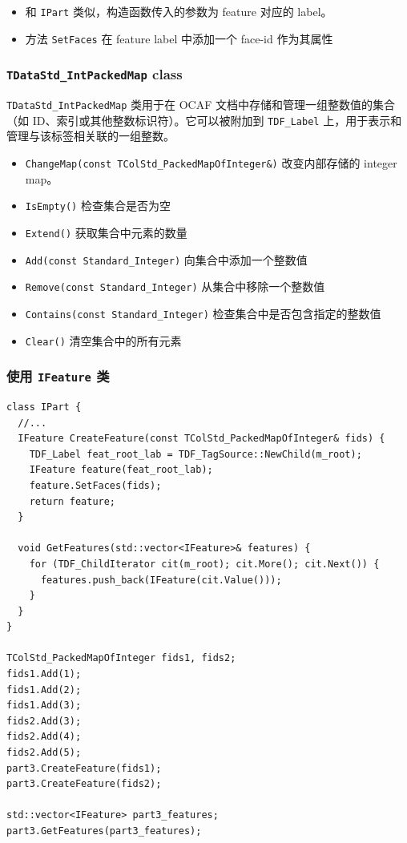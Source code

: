 \documentclass[11pt]{article}
\begin{document}
\begin{itemize}
\item 和 \texttt{IPart} 类似，构造函数传入的参数为 feature 对应的 label。
\item 方法 \texttt{SetFaces} 在 feature label 中添加一个 face-id 作为其属性
\end{itemize}
\subsubsection{\texttt{TDataStd\_IntPackedMap} class}
\label{sec:org2256694}

\texttt{TDataStd\_IntPackedMap} 类用于在 OCAF 文档中存储和管理一组整数值的集合（如 ID、索引或其他整数标识符）。它可以被附加到 \texttt{TDF\_Label} 上，用于表示和管理与该标签相关联的一组整数。

\begin{itemize}
\item \texttt{ChangeMap(const TColStd\_PackedMapOfInteger\&)} 改变内部存储的 integer map。
\item \texttt{IsEmpty()} 检查集合是否为空
\item \texttt{Extend()} 获取集合中元素的数量
\item \texttt{Add(const Standard\_Integer)} 向集合中添加一个整数值
\item \texttt{Remove(const Standard\_Integer)} 从集合中移除一个整数值
\item \texttt{Contains(const Standard\_Integer)} 检查集合中是否包含指定的整数值
\item \texttt{Clear()} 清空集合中的所有元素
\end{itemize}
\subsubsection{使用 \texttt{IFeature} 类}
\label{sec:org156f118}

\begin{verbatim}
class IPart {
  //...
  IFeature CreateFeature(const TColStd_PackedMapOfInteger& fids) {
    TDF_Label feat_root_lab = TDF_TagSource::NewChild(m_root);
    IFeature feature(feat_root_lab);
    feature.SetFaces(fids);
    return feature;
  }

  void GetFeatures(std::vector<IFeature>& features) {
    for (TDF_ChildIterator cit(m_root); cit.More(); cit.Next()) {
      features.push_back(IFeature(cit.Value()));
    }
  }
}

TColStd_PackedMapOfInteger fids1, fids2;
fids1.Add(1);
fids1.Add(2);
fids1.Add(3);
fids2.Add(3);
fids2.Add(4);
fids2.Add(5);
part3.CreateFeature(fids1);
part3.CreateFeature(fids2);

std::vector<IFeature> part3_features;
part3.GetFeatures(part3_features);
\end{verbatim}
\end{document}
